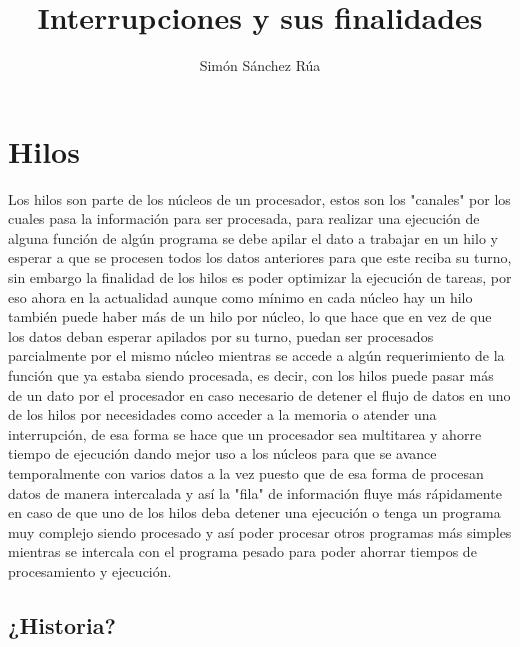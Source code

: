 \documentclass[letterpaper]{article}
\title{\textbf{Interrupciones y sus finalidades}}
\author{Simón Sánchez Rúa}
\affil{Facultad de Ingeniería Univesridad de Antioquia}
\begin{document}
	
	
%
\maketitle
\renewenvironment{abstract}
 {\quotation\small\noindent\rule{\linewidth}{.5pt}\par\smallskip
  {\centering\bfseries\abstractname\par}\medskip}
 {\par\noindent\rule{\linewidth}{.5pt}\endquotation}


\section{Hilos}

Los hilos son parte de los núcleos de un procesador, estos son los "canales" por los cuales pasa la información para ser procesada, para realizar una ejecución de alguna función de algún programa se debe apilar el dato a trabajar en un hilo y esperar a que se procesen todos los datos anteriores para que este reciba su turno, sin embargo la finalidad de los hilos es poder optimizar la ejecución de tareas, por eso ahora en la actualidad aunque como mínimo en cada núcleo hay un hilo también puede haber más de un hilo por núcleo, lo que hace que en vez de que los datos deban esperar apilados por su turno, puedan ser procesados parcialmente por el mismo núcleo mientras se accede a algún requerimiento de la función que ya estaba siendo procesada, es decir, con los hilos puede pasar más de un dato por el procesador en caso necesario de detener el flujo de datos en uno de los hilos por necesidades como acceder a la memoria o atender una interrupción, de esa forma se hace que un procesador sea multitarea y ahorre tiempo de ejecución dando mejor uso a los núcleos para que se avance temporalmente con varios datos a la vez puesto que de esa forma de procesan datos de manera intercalada y así la "fila" de información fluye más rápidamente en caso de que uno de los hilos deba detener una ejecución o tenga un programa muy complejo siendo procesado y así poder procesar otros programas más simples mientras se intercala con el programa pesado para poder ahorrar tiempos de procesamiento y ejecución.

\subsection{¿Historia?}
\end{document}
